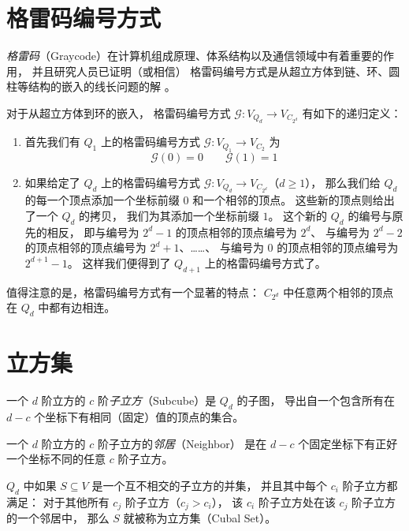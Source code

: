\section{格雷码编号方式}
\label{Section 2.3}

\emph{格雷码}（Graycode）在计算机组成原理、体系结构以及通信领域中有着重要的作用，
并且研究人员已证明（或相信）
格雷码编号方式是从超立方体到链、环、圆柱等结构的嵌入的线长问题的解
\cite{Harper.1964,Guu.1997,Manuel.2011}。

对于从超立方体到环的嵌入，
格雷码编号方式 $\mathcal{G} \colon V_{Q_d} \rightarrow V_{C_{2^d}}$ 有如下的递归定义：
\begin{enumerate}[(1)]
	\item 首先我们有 $Q_1$ 上的格雷码编号方式
		$\mathcal{G} \colon V_{Q_1} \rightarrow V_{C_2}$ 为
		\begin{equation*}
		\mathcal{G}(0) = 0 \qquad \mathcal{G}(1) = 1
		\end{equation*}
	\item 如果给定了 $Q_d$ 上的格雷码编号方式
		$\mathcal{G} \colon V_{Q_d} \rightarrow V_{C_{2^d}}$（$d \ge 1$），
		那么我们给 $Q_d$ 的每一个顶点添加一个坐标前缀 $0$ 和一个相邻的顶点。
		这些新的顶点则给出了一个 $Q_d$ 的拷贝，
		我们为其添加一个坐标前缀 $1$。
		这个新的 $Q_d$ 的编号与原先的相反，
		即与编号为 $2^d - 1$ 的顶点相邻的顶点编号为 $2^d$、
		与编号为 $2^d - 2$ 的顶点相邻的顶点编号为 $2^d + 1$、……、
		与编号为 $0$ 的顶点相邻的顶点编号为 $2^{d + 1} - 1$。
		这样我们便得到了 $Q_{d + 1}$ 上的格雷码编号方式了。
\end{enumerate}
值得注意的是，格雷码编号方式有一个显著的特点：
$C_{2^d}$ 中任意两个相邻的顶点在 $Q_d$ 中都有边相连。

\section{立方集}
\label{Section 2.4}

一个 $d$ 阶立方的 $c$ 阶\emph{子立方}（Subcube）是 $Q_d$ 的子图，
导出自一个包含所有在 $d − c$ 个坐标下有相同（固定）值的顶点的集合。

一个 $d$ 阶立方的 $c$ 阶子立方的\emph{邻居}（Neighbor）
是在 $d − c$ 个固定坐标下有正好一个坐标不同的任意 $c$ 阶子立方。

$Q_d$ 中如果 $S \subseteq V$ 是一个互不相交的子立方的并集，
并且其中每个 $c_i$ 阶子立方都满足：
对于其他所有 $c_j$ 阶子立方（$c_j > c_i$），
该 $c_i$ 阶子立方处在该 $c_j$ 阶子立方的一个邻居中，
那么 $S$ 就被称为立方集（Cubal Set）。

